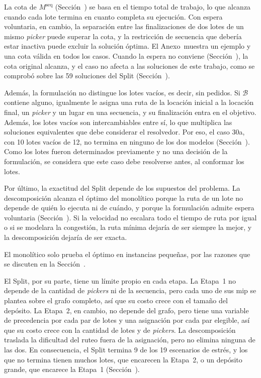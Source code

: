 La cota de
$M^{\text{seq}}$ (Sección~) se basa en el tiempo total de
trabajo, lo que alcanza cuando cada lote termina en cuanto completa su
ejecución. Con espera voluntaria, en cambio, la separación entre las
finalizaciones de dos lotes de un mismo {\em picker} puede superar la cota, y
la restricción de secuencia que debería estar inactiva puede excluir la
solución óptima. El Anexo~ muestra un ejemplo y una cota
válida en todos los casos. Cuando la espera no conviene
(Sección~), la cota original alcanza, y el caso no
afecta a las soluciones de este trabajo, como se comprobó sobre las 59
soluciones del Split (Sección~).

Además, la formulación no distingue los lotes vacíos, es decir, sin pedidos. Si
$\mathcal{B}$ contiene alguno, igualmente le asigna una ruta de la locación inicial a
la locación final, un {\em picker} y un lugar en una secuencia, y su finalización
entra en el objetivo. Además, los lotes vacíos son intercambiables entre sí,
lo que multiplica las soluciones equivalentes que debe considerar el
resolvedor. Por eso, el caso 30a, con 10 lotes vacíos de 12, no termina en
ninguno de los dos modelos (Sección~). Como los
lotes fueron determinados previamente y no una decisión de la formulación, se
considera que este caso debe resolverse antes, al conformar los lotes.

Por último, la exactitud del Split depende de los supuestos del problema. La descomposición alcanza el óptimo del monolítico
porque la ruta de un lote no depende de quién lo ejecuta ni de cuándo, y
porque la formulación admite espera voluntaria
(Sección~). Si la velocidad no escalara todo el tiempo
de ruta por igual o si se modelara la congestión, la ruta mínima dejaría de
ser siempre la mejor, y la descomposición dejaría de ser exacta.

\stopsubsubsection

\startsubsubsection[title={Costo de resolución}]

El monolítico solo prueba el óptimo en instancias pequeñas, por las razones
que se discuten en la Sección~.

El Split, por su parte, tiene un límite propio en cada etapa. La Etapa~1 no
depende de la cantidad de {\em pickers} ni de la secuencia, pero cada uno
de sus \ac{mip} se plantea sobre el grafo completo, así que su costo crece
con el tamaño del depósito. La Etapa~2, en cambio, no depende del grafo,
pero tiene una variable de precedencia por cada par de lotes y una
asignación por cada par elegible, así que su costo crece con la cantidad
de lotes y de {\em pickers}. La descomposición traslada la dificultad del
ruteo fuera de la asignación, pero no elimina ninguna de las dos. En
consecuencia, el Split termina 9 de los 19 escenarios de estrés, y los que no
termina tienen muchos lotes, que encarecen la Etapa~2, o un depósito grande,
que encarece la Etapa~1 (Sección~).

